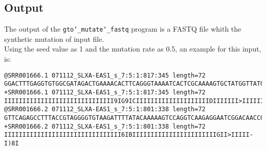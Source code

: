 \subsection*{Output}
The output of the \texttt{gto\char`_mutate\char`_fastq} program is a FASTQ file whith the synthetic mutation of input file.\\
Using the seed value as 1 and the mutation rate as 0.5, an example for this input, is: 
\begin{lstlisting}
@SRR001666.1 071112_SLXA-EAS1_s_7:5:1:817:345 length=72
GGACTTTGAGGTGTGGCGATAGACTGAAAACACTTCAGGGTAAAATCACTCGCAAAAGTGCTATGGTTATGG
+SRR001666.1 071112_SLXA-EAS1_s_7:5:1:817:345 length=72
IIIIIIIIIIIIIIIIIIIIIIIIIIIIII9IG9ICIIIIIIIIIIIIIIIIIIIIDIIIIIII>IIIIII/
@SRR001666.2 071112_SLXA-EAS1_s_7:5:1:801:338 length=72
GTTCAGAGCCTTTACCGTAGGGGTGTAAGATTTTATACAAAAAGTCCAGGTCAAGAGGAATCGGACAACCGA
+SRR001666.2 071112_SLXA-EAS1_s_7:5:1:801:338 length=72
IIIIIIIIIIIIIIIIIIIIIIIIIIIIIIII6IBIIIIIIIIIIIIIIIIIIIIIIIGII>IIIII-I)8I
\end{lstlisting}
